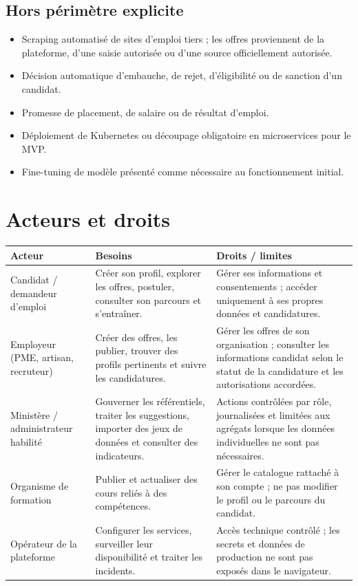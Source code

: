 \documentclass[11pt,a4paper]{article}
\begin{document}
\subsection{Hors périmètre explicite}
\begin{itemize}
  \item Scraping automatisé de sites d'emploi tiers ; les offres proviennent de la plateforme, d'une saisie autorisée ou d'une source officiellement autorisée.
  \item Décision automatique d'embauche, de rejet, d'éligibilité ou de sanction d'un candidat.
  \item Promesse de placement, de salaire ou de résultat d'emploi.
  \item Déploiement de Kubernetes ou découpage obligatoire en microservices pour le MVP.
  \item Fine-tuning de modèle présenté comme nécessaire au fonctionnement initial.
\end{itemize}

\section{Acteurs et droits}

\begin{longtable}{>{\raggedright\arraybackslash}p{} >{\raggedright\arraybackslash}p{} >{\raggedright\arraybackslash}p{}}
\toprule
\textbf{Acteur} & \textbf{Besoins} & \textbf{Droits / limites}\\
\midrule
\endhead
Candidat / demandeur d'emploi & Créer son profil, explorer les offres, postuler, consulter son parcours et s'entraîner. & Gérer ses informations et consentements ; accéder uniquement à ses propres données et candidatures.\\
Employeur (PME, artisan, recruteur) & Créer des offres, les publier, trouver des profils pertinents et suivre les candidatures. & Gérer les offres de son organisation ; consulter les informations candidat selon le statut de la candidature et les autorisations accordées.\\
Ministère / administrateur habilité & Gouverner les référentiels, traiter les suggestions, importer des jeux de données et consulter des indicateurs. & Actions contrôlées par rôle, journalisées et limitées aux agrégats lorsque les données individuelles ne sont pas nécessaires.\\
Organisme de formation & Publier et actualiser des cours reliés à des compétences. & Gérer le catalogue rattaché à son compte ; ne pas modifier le profil ou le parcours du candidat.\\
Opérateur de la plateforme & Configurer les services, surveiller leur disponibilité et traiter les incidents. & Accès technique contrôlé ; les secrets et données de production ne sont pas exposés dans le navigateur.\\
\bottomrule
\end{longtable}
\end{document}
